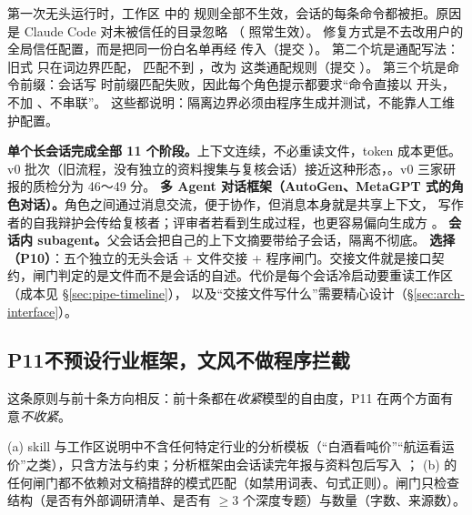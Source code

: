 \begin{failcase}[：权限白名单在无头模式下失效]
第一次无头运行时，工作区  中的  规则全部不生效，会话的每条命令都被拒。原因是 Claude Code 对未被信任的目录忽略 （ 照常生效）。
修复方式是不去改用户的全局信任配置，而是把同一份白名单再经  传入（提交 ）。
第二个坑是通配写法：旧式  只在词边界匹配， 匹配不到 ，改为  这类通配规则（提交 ）。
第三个坑是命令前缀：会话写  时前缀匹配失败，因此每个角色提示都要求“命令直接以  开头，不加 、不串联”。
这些都说明：隔离边界必须由程序生成并测试，不能靠人工维护配置。
\end{failcase}

\begin{tradeoff}
\textbf{单个长会话完成全部 11 个阶段。}上下文连续，不必重读文件，token 成本更低。v0 批次（旧流程，没有独立的资料搜集与复核会话）接近这种形态，。v0 三家研报的质检分为 46～49 分。
\textbf{多 Agent 对话框架（AutoGen、MetaGPT 式的角色对话）\citep{wu2023autogen,hong2024metagpt}。}角色之间通过消息交流，便于协作，但消息本身就是共享上下文，
写作者的自我辩护会传给复核者；评审者若看到生成过程，也更容易偏向生成方 \citep{panickssery2024self}。
\textbf{会话内 subagent。}父会话会把自己的上下文摘要带给子会话，隔离不彻底。
\textbf{选择（P10）}：五个独立的无头会话 + 文件交接 + 程序闸门。交接文件就是接口契约，闸门判定的是文件而不是会话的自述。代价是每个会话冷启动要重读工作区（成本见 \S\ref{sec:pipe-timeline}），
以及“交接文件写什么”需要精心设计（\S\ref{sec:arch-interface}）。
\end{tradeoff}

\subsection{P11\quad 不预设行业框架，文风不做程序拦截}
\label{sec:pr-p11}

这条原则与前十条方向相反：前十条都在\emph{收紧}模型的自由度，P11 在两个方面有意\emph{不收紧}。

\begin{invariant}[负向不变量]\label{inv:pr-neg}
(a) skill 与工作区说明中不含任何特定行业的分析模板（“白酒看吨价”“航运看运价”之类），只含方法与约束；分析框架由会话读完年报与资料包后写入 ；
(b)  的任何闸门都不依赖对文稿措辞的模式匹配（如禁用词表、句式正则）。闸门只检查结构（是否有外部调研清单、是否有 $\ge3$ 个深度专题）与数量（字数、来源数）。
\end{invariant}

